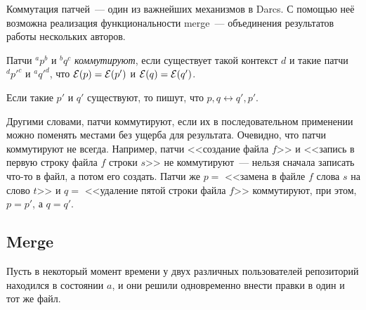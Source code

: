 Коммутация патчей~--- один из важнейших механизмов в Darcs. С помощью
неё возможна реализация функциональности merge~--- объединения
результатов работы нескольких авторов.

\begin{definition}
  Патчи ${}^ap^b$ и ${}^bq^c$ \emph{коммутируют}, если существует
  такой контекст $d$ и такие патчи ${}^d{p'}^c$ и ${}^a{q'}^d$, что
  ${\cal E}(p) = {\cal E}(p')$ и ${\cal E}(q) = {\cal E}(q')$.

  Если такие $p'$ и $q'$ существуют, то пишут, что $p, q
  \longleftrightarrow q', p'$.
\end{definition}

Другими словами, патчи коммутируют, если их в последовательном
применении можно поменять местами без ущерба для результата.
Очевидно, что патчи коммутируют не всегда. Например, патчи <<создание
файла $f$>> и <<запись в первую строку файла $f$ строки $s$>> не
коммутируют~--- нельзя сначала записать что-то в файл, а потом его
создать. Патчи же $p = $ <<замена в файле $f$ слова $s$ на слово $t$>>
и $q = $ <<удаление пятой строки файла $f$>> коммутируют, при этом, $p
= p'$, а $q = q'$. 

\subsection{Merge}

Пусть в некоторый момент времени у двух различных пользователей
репозиторий находился в состоянии $a$, и они решили одновременно
внести правки в один и тот же файл. 



